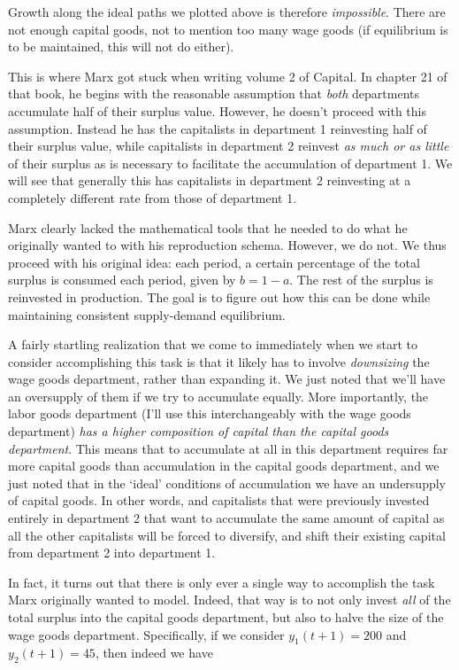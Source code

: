 \documentclass{article}
\theoremstyle{theorem}
\begin{document}
Growth along the ideal paths we plotted above is therefore \emph{impossible}. There are not enough capital goods, not to mention too many wage goods (if equilibrium is to be maintained, this will not do either). \par 
This is where Marx got stuck when writing volume 2 of Capital. In chapter 21 of that book, he begins with the reasonable assumption that \emph{both} departments accumulate half of their surplus value. However, he doesn't proceed with this assumption. Instead he has the capitalists in department 1 reinvesting half of their surplus value, while capitalists in department 2 reinvest \emph{as much or as little} of their surplus as is necessary to facilitate the accumulation of department 1. We will see that generally this has capitalists in department 2 reinvesting at a completely different rate from those of department 1. \par 
Marx clearly lacked the mathematical tools that he needed to do what he originally wanted to with his reproduction schema. However, we do not. We thus proceed with his original idea: each period, a certain percentage of the total surplus is consumed each period, given by $b=1-a$. The rest of the surplus is reinvested in production. The goal is to figure out how this can be done while maintaining consistent supply-demand equilibrium. \par 
A fairly startling realization that we come to immediately when we start to consider accomplishing this task is that it likely has to involve \emph{downsizing} the wage goods department, rather than expanding it. We just noted that we'll have an oversupply of them if we try to accumulate equally. More importantly, the labor goods department (I'll use this interchangeably with the wage goods department) \emph{has a higher composition of capital than the capital goods department}. This means that to accumulate at all in this department requires far more capital goods than accumulation in the capital goods department, and we just noted that in the `ideal' conditions of accumulation we have an undersupply of capital goods. In other words, and capitalists that were previously invested entirely in department 2 that want to accumulate the same amount of capital as all the other capitalists will be forced to diversify, and shift their existing capital from department 2 into department 1. \par 
In fact, it turns out that there is only ever a single way to accomplish the task Marx originally wanted to model. Indeed, that way is to not only invest \emph{all} of the total surplus into the capital goods department, but also to halve the size of the wage goods department. Specifically, if we consider $y_1(t+1) = 200$ and $y_2(t+1) = 45$, then indeed we have
\end{document}
